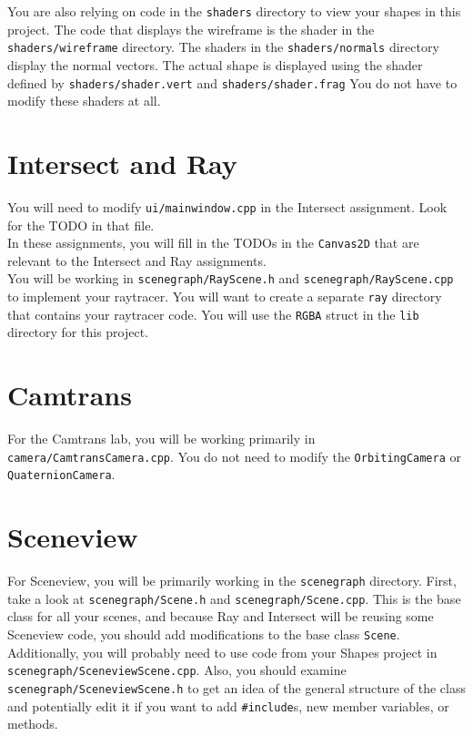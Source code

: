 \documentclass[landscape,twocolumn,letterpaper]{article}
\begin{document}
\noindent
You are also relying on code in the \texttt{shaders} directory to view your shapes in this project. The code that displays the wireframe is the shader in the \texttt{shaders/wireframe} directory. The shaders in the \texttt{shaders/normals} directory display the normal vectors. The actual shape is displayed using the shader defined by \texttt{shaders/shader.vert} and \texttt{shaders/shader.frag} You do not have to modify these shaders at all.\\

\section{Intersect and Ray}

You will need to modify \texttt{ui/mainwindow.cpp} in the Intersect assignment. Look for the TODO in that file. \\

\noindent
In these assignments, you will fill in the TODOs in the \texttt{Canvas2D} that are relevant to the Intersect and Ray assignments.\\

\noindent
You will be working in \texttt{scenegraph/RayScene.h} and \texttt{scenegraph/RayScene.cpp} to implement your raytracer. You will want to create a separate \texttt{ray} directory that contains your raytracer code. You will use the \texttt{RGBA} struct in the \texttt{lib} directory for this project.

\section{Camtrans}

For the Camtrans lab, you will be working primarily in \texttt{camera/CamtransCamera.cpp}. You do not need to modify the \texttt{OrbitingCamera} or \texttt{QuaternionCamera}.

\section{Sceneview}

For Sceneview, you will be primarily working in the \texttt{scenegraph} directory. First, take a look at \texttt{scenegraph/Scene.h} and \texttt{scenegraph/Scene.cpp}. This is the base class for all your scenes, and because Ray and Intersect will be reusing some Sceneview code, you should add modifications to the base class \texttt{Scene}. Additionally, you will probably need to use code from your Shapes project in \texttt{scenegraph/SceneviewScene.cpp}. Also, you should examine \texttt{scenegraph/SceneviewScene.h} to get an idea of the general structure of the class and potentially edit it if you want to add \texttt{\#include}s, new member variables, or methods. \\
\end{document}
